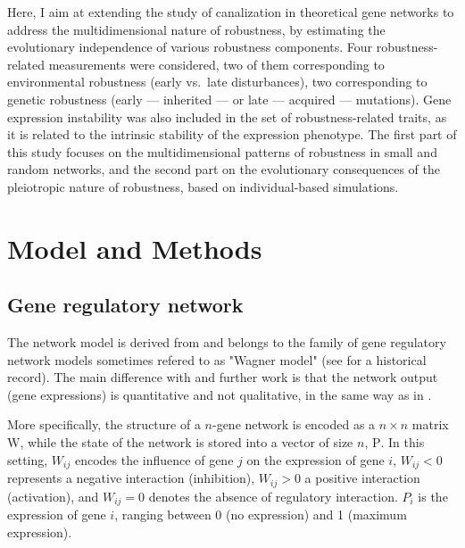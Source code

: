\documentclass[10pt,a4paper]{article}
\newcommand{\W}{\bm{\mathrm W}}
\newcommand{\Pp}{\bm{\mathrm P}}
\begin{document}
Here, I aim at extending the study of canalization in theoretical gene networks to address the multidimensional nature of robustness, by estimating the evolutionary independence of various robustness components. Four robustness-related measurements were considered, two of them corresponding to environmental robustness (early vs.\ late disturbances), two corresponding to genetic robustness (early --- inherited --- or late --- acquired --- mutations). Gene expression instability was also included in the set of robustness-related traits, as it is related to the intrinsic stability of the expression phenotype. The first part of this study focuses on the multidimensional patterns of robustness in small and random networks, and the second part on the evolutionary consequences of the pleiotropic nature of robustness, based on individual-based simulations. 

\section{Model and Methods}

\subsection{Gene regulatory network}

The network model is derived from \citet{Wag94,Wag96} and belongs to the family of gene regulatory network models sometimes refered to as "Wagner model" (see \citealp{FP15} for a historical record). The main difference with \citet{Wag96} and further work is that the network output (gene expressions) is quantitative and not qualitative, in the same way as in \citet{SB02}. 

More specifically, the structure of a $n$-gene network is encoded as a $n\times n$ matrix $\W$, while the state of the network is stored into a vector of size $n$, $\Pp$. In this setting, $W_{ij}$ encodes the influence of gene $j$ on the expression of gene $i$, $W_{ij} < 0$ represents a negative interaction (inhibition), $W_{ij} > 0$ a positive interaction (activation), and $W_{ij} = 0$ denotes the absence of regulatory interaction. $P_i$ is the expression of gene $i$, ranging between 0 (no expression) and 1 (maximum expression). 
\end{document}
